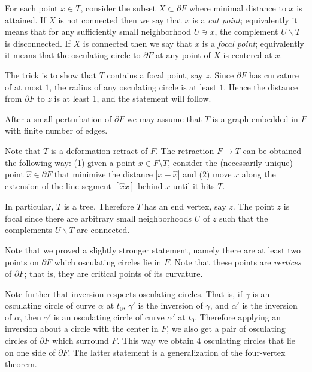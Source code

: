 For each point $x\in T$, consider the subset $X\subset\partial F$ where minimal distance to $x$ is attained.
If $X$ is not connected then we say that $x$ is a \emph{cut point};
equivalently it means that for any sufficiently small neighborhood $U\ni x$, 
the complement $U\backslash T$ is disconnected.
If $X$ is connected 
then we say that $x$ is a \emph{focal point};
equivalently it means that the osculating circle to $\partial F$ at any point of $X$ is centered at $x$.

The trick is to show that $T$ contains a focal point, say $z$.
Since $\partial F$ has curvature of at most $1$, the radius of any osculating circle is at least $1$.
Hence the distance from $\partial F$ to $z$ is at least 1,
and the statement will follow.

\medskip

After a small perturbation
of $\partial F$ we may assume that
$T$ is a graph embedded in
$F$ with finite number of edges.

Note that $T$ is a
deformation retract of $F$.
The retraction $F\to T$ can be obtained the following way:
(1) given a point $x\in F\setminus T$,
consider the (necessarily unique) point $\hat x\in \partial F$ that minimize the distance $|x-\hat x|$ and
(2) move $x$ along the extension of the line segment $[\hat x x]$ behind $x$ until it hits $T$.

In particular, $T$ is a tree.
Therefore $T$ has
an end vertex, say $z$.
The point $z$ is focal since there are arbitrary small neighborhoods $U$ of $z$ such that the complements $U\backslash T$ are connected.
\qeds

Note that we proved a slightly stronger statement, namely there are at least two points on $\partial F$ which osculating circles lie in $F$.
Note that these points are \emph{vertices} of $\partial F$;
that is, they are critical points of its curvature.

Note further that inversion respects osculating circles.
That is, if $\gamma$ is an osculating circle of curve $\alpha$ at $t_0$,
$\gamma'$ is the inversion of $\gamma$, and 
$\alpha'$ is the inversion of $\alpha$,
then $\gamma'$ is an osculating circle of curve $\alpha'$ at $t_0$.
Therefore applying an inversion about a circle with the center in $F$, we also get a pair of osculating circles of $\partial F$ which surround $F$.
This way we obtain 4 osculating circles that lie on one side of $\partial F$.
The latter statement is a generalization of the four-vertex theorem.

